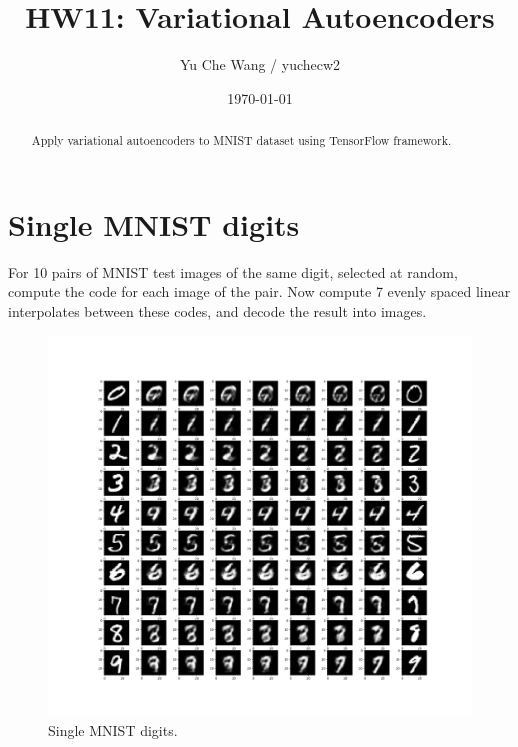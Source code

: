 \documentclass[a4paper]{article}
\title{HW11: Variational Autoencoders}
\author{Yu Che Wang / yuchecw2}
\date{\today}
\begin{document}
\maketitle

\begin{abstract}
Apply variational autoencoders to MNIST dataset using TensorFlow framework.
\end{abstract}

\section{Single MNIST digits}
For 10 pairs of MNIST test images of the same digit, selected at random, compute the code for each image of the pair. Now compute 7 evenly spaced linear interpolates between these codes, and decode the result into images.

\begin{figure}[H]
\centering
\includegraphics[width=1\textwidth]{same.png}
\caption{\label{fig:data}Single MNIST digits.}
\end{figure}
\end{document}
